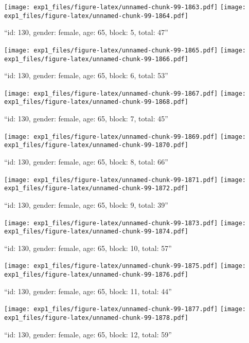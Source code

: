 \documentclass[,]{article}
\begin{document}
\texttt{[image: exp1\_files/figure-latex/unnamed-chunk-99-1863.pdf]}
\texttt{[image: exp1\_files/figure-latex/unnamed-chunk-99-1864.pdf]}

\newpage
[1] 

``id: 130, gender: female, age: 65, block: 5, total: 47''

\texttt{[image: exp1\_files/figure-latex/unnamed-chunk-99-1865.pdf]}
\texttt{[image: exp1\_files/figure-latex/unnamed-chunk-99-1866.pdf]}

\newpage
[1] 

``id: 130, gender: female, age: 65, block: 6, total: 53''

\texttt{[image: exp1\_files/figure-latex/unnamed-chunk-99-1867.pdf]}
\texttt{[image: exp1\_files/figure-latex/unnamed-chunk-99-1868.pdf]}

\newpage
[1] 

``id: 130, gender: female, age: 65, block: 7, total: 45''

\texttt{[image: exp1\_files/figure-latex/unnamed-chunk-99-1869.pdf]}
\texttt{[image: exp1\_files/figure-latex/unnamed-chunk-99-1870.pdf]}

\newpage
[1] 

``id: 130, gender: female, age: 65, block: 8, total: 66''

\texttt{[image: exp1\_files/figure-latex/unnamed-chunk-99-1871.pdf]}
\texttt{[image: exp1\_files/figure-latex/unnamed-chunk-99-1872.pdf]}

\newpage
[1] 

``id: 130, gender: female, age: 65, block: 9, total: 39''

\texttt{[image: exp1\_files/figure-latex/unnamed-chunk-99-1873.pdf]}
\texttt{[image: exp1\_files/figure-latex/unnamed-chunk-99-1874.pdf]}

\newpage
[1] 

``id: 130, gender: female, age: 65, block: 10, total: 57''

\texttt{[image: exp1\_files/figure-latex/unnamed-chunk-99-1875.pdf]}
\texttt{[image: exp1\_files/figure-latex/unnamed-chunk-99-1876.pdf]}

\newpage
[1] 

``id: 130, gender: female, age: 65, block: 11, total: 44''

\texttt{[image: exp1\_files/figure-latex/unnamed-chunk-99-1877.pdf]}
\texttt{[image: exp1\_files/figure-latex/unnamed-chunk-99-1878.pdf]}

\newpage
[1] 

``id: 130, gender: female, age: 65, block: 12, total: 59''
\end{document}
